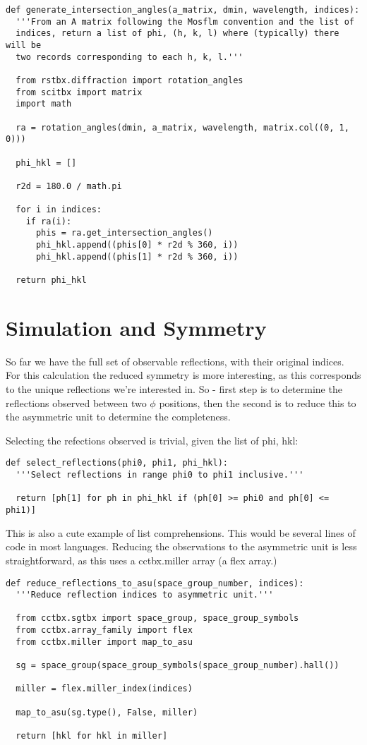 \documentclass[a4paper, 11pt]{article}
\begin{document}
{\small
\begin{verbatim}
def generate_intersection_angles(a_matrix, dmin, wavelength, indices):
  '''From an A matrix following the Mosflm convention and the list of
  indices, return a list of phi, (h, k, l) where (typically) there will be
  two records corresponding to each h, k, l.'''

  from rstbx.diffraction import rotation_angles
  from scitbx import matrix
  import math

  ra = rotation_angles(dmin, a_matrix, wavelength, matrix.col((0, 1, 0)))

  phi_hkl = []

  r2d = 180.0 / math.pi

  for i in indices:
    if ra(i):
      phis = ra.get_intersection_angles()
      phi_hkl.append((phis[0] * r2d % 360, i))
      phi_hkl.append((phis[1] * r2d % 360, i))

  return phi_hkl
\end{verbatim}
}

\section{Simulation and Symmetry}

So far we have the full set of observable reflections, with their original indices. For this calculation the reduced symmetry is more interesting, as this corresponds to the unique reflections we're interested in. So - first step is to determine the reflections observed between two $\phi$ positions, then the second is to reduce this to the asymmetric unit to determine the completeness.

Selecting the refections observed is trivial, given the list of phi, hkl:

{\small
\begin{verbatim}
def select_reflections(phi0, phi1, phi_hkl):
  '''Select reflections in range phi0 to phi1 inclusive.'''

  return [ph[1] for ph in phi_hkl if (ph[0] >= phi0 and ph[0] <= phi1)]
\end{verbatim}
}

This is also a cute example of list comprehensions. This would be several lines of code in most languages. Reducing the observations to the asymmetric unit is less straightforward, as this uses a cctbx.miller array (a flex array.)

{\small
\begin{verbatim}
def reduce_reflections_to_asu(space_group_number, indices):
  '''Reduce reflection indices to asymmetric unit.'''

  from cctbx.sgtbx import space_group, space_group_symbols
  from cctbx.array_family import flex
  from cctbx.miller import map_to_asu

  sg = space_group(space_group_symbols(space_group_number).hall())

  miller = flex.miller_index(indices)

  map_to_asu(sg.type(), False, miller)

  return [hkl for hkl in miller]
\end{verbatim}
}
\end{document}
